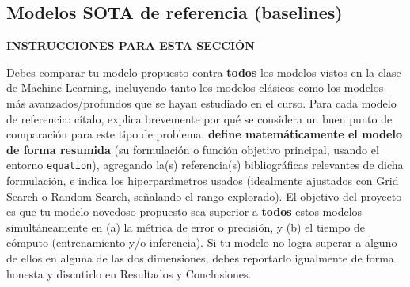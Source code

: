 \documentclass[pdflatex,sn-mathphys-num]{sn-jnl}
\newenvironment{instruccion}{%
  \par\noindent\textbf{\color{blue!55!black}INSTRUCCIONES PARA ESTA SECCIÓN}%
  \par\vspace{2pt}\noindent\itshape\small
}{%
  \par\normalfont\vspace{6pt}
}
\begin{document}
\subsection{Modelos SOTA de referencia (baselines)}\label{subsec:sota}

\begin{instruccion}
Debes comparar tu modelo propuesto contra \textbf{todos} los modelos vistos en la clase de Machine Learning, incluyendo tanto los modelos clásicos como los modelos más avanzados/profundos que se hayan estudiado en el curso. Para cada modelo de referencia: cítalo, explica brevemente por qué se considera un buen punto de comparación para este tipo de problema, \textbf{define matemáticamente el modelo de forma resumida} (su formulación o función objetivo principal, usando el entorno \texttt{equation}), agregando la(s) referencia(s) bibliográficas relevantes de dicha formulación, e indica los hiperparámetros usados (idealmente ajustados con Grid Search o Random Search, señalando el rango explorado). El objetivo del proyecto es que tu modelo novedoso propuesto sea superior a \textbf{todos} estos modelos simultáneamente en (a) la métrica de error o precisión, y (b) el tiempo de cómputo (entrenamiento y/o inferencia). Si tu modelo no logra superar a alguno de ellos en alguna de las dos dimensiones, debes reportarlo igualmente de forma honesta y discutirlo en Resultados y Conclusiones.
\end{instruccion}
\end{document}
